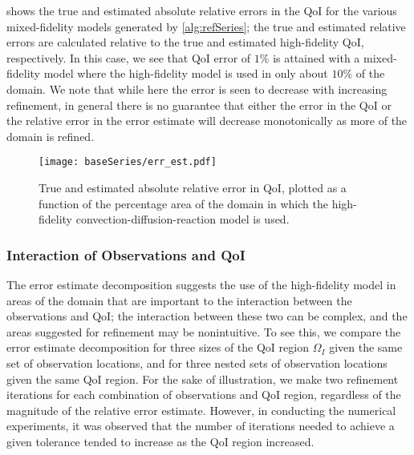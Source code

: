  shows the true and estimated absolute relative errors in the QoI for the various mixed-fidelity models generated by \cref{alg:refSeries}; the true and estimated relative errors are calculated relative to the true and estimated high-fidelity QoI, respectively. In this case, we see that QoI error of $1\%$ is attained with a mixed-fidelity model where the high-fidelity model is used in only about $10\%$ of the domain. We note that while here the error is seen to decrease with increasing refinement, in general there is no guarantee that either the error in the QoI or the relative error in the error estimate will decrease monotonically as more of the domain is refined.
%
\begin{figure}[htbp]
\centering
\texttt{[image: baseSeries/err\_est.pdf]}
\caption{True and estimated absolute relative error in QoI, plotted as a function of the percentage area of the domain in which the high-fidelity convection-diffusion-reaction model is used.}
\label{fig:baseErr}
\end{figure}
%

\subsubsection{Interaction of Observations and QoI} \label{sec:qoivdata}
%
The error estimate decomposition suggests the use of the high-fidelity model in areas of the domain that are important to the interaction between the observations and QoI; the interaction between these two can be complex, and the areas suggested for refinement may be nonintuitive. To see this, we compare the error estimate decomposition for three sizes of the QoI region $\Omega_I$ given the same set of observation locations, and for three nested sets of observation locations given the same QoI region. For the sake of illustration, we make two refinement iterations for each combination of observations and QoI region, regardless of the magnitude of the relative error estimate. However, in conducting the numerical experiments, it was observed that the number of iterations needed to achieve a given tolerance tended to increase as the QoI region increased.

